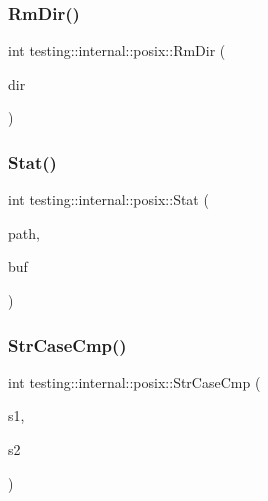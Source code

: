 \mbox{\label{namespacetesting_1_1internal_1_1posix_acbad5d4ea5b73fd1765f5f760642932a}} 
\subsubsection{\texorpdfstring{RmDir()}{RmDir()}}
{\footnotesize\ttfamily int testing\+::internal\+::posix\+::\+Rm\+Dir (\begin{DoxyParamCaption}\item[{const char $\ast$}]{dir }\end{DoxyParamCaption})\hspace{0.3cm}{\ttfamily [inline]}}

\mbox{\label{namespacetesting_1_1internal_1_1posix_a2b87b7ff647a128614daf50667eb9304}} 
\subsubsection{\texorpdfstring{Stat()}{Stat()}}
{\footnotesize\ttfamily int testing\+::internal\+::posix\+::\+Stat (\begin{DoxyParamCaption}\item[{const char $\ast$}]{path,  }\item[{\mbox{\hyperlink{namespacetesting_1_1internal_1_1posix_a8eb9f08d3af29941c2d2a964cfff3ecb}{Stat\+Struct}} $\ast$}]{buf }\end{DoxyParamCaption})\hspace{0.3cm}{\ttfamily [inline]}}

\mbox{\label{namespacetesting_1_1internal_1_1posix_a1ef2385a7f8e4c706054da35967e76bd}} 
\subsubsection{\texorpdfstring{StrCaseCmp()}{StrCaseCmp()}}
{\footnotesize\ttfamily int testing\+::internal\+::posix\+::\+Str\+Case\+Cmp (\begin{DoxyParamCaption}\item[{const char $\ast$}]{s1,  }\item[{const char $\ast$}]{s2 }\end{DoxyParamCaption})\hspace{0.3cm}{\ttfamily [inline]}}

